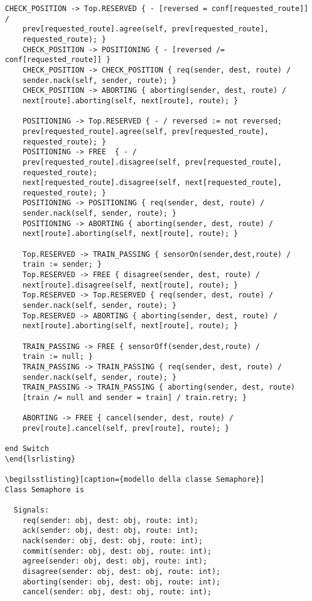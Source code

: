 \begin{lstlisting}[caption={modello della classe Switch}]
    CHECK_POSITION -> Top.RESERVED { - [reversed = conf[requested_route]] / 
    prev[requested_route].agree(self, prev[requested_route], 
    requested_route); }
    CHECK_POSITION -> POSITIONING { - [reversed /= conf[requested_route]] }
    CHECK_POSITION -> CHECK_POSITION { req(sender, dest, route) / 
    sender.nack(self, sender, route); }
    CHECK_POSITION -> ABORTING { aborting(sender, dest, route) / 
    next[route].aborting(self, next[route], route); }

    POSITIONING -> Top.RESERVED { - / reversed := not reversed; 
    prev[requested_route].agree(self, prev[requested_route], 
    requested_route); }
    POSITIONING -> FREE  { - / 
    prev[requested_route].disagree(self, prev[requested_route], 
    requested_route); 
    next[requested_route].disagree(self, next[requested_route], 
    requested_route); }
    POSITIONING -> POSITIONING { req(sender, dest, route) / 
    sender.nack(self, sender, route); }
    POSITIONING -> ABORTING { aborting(sender, dest, route) / 
    next[route].aborting(self, next[route], route); }

    Top.RESERVED -> TRAIN_PASSING { sensorOn(sender,dest,route) / 
    train := sender; }
    Top.RESERVED -> FREE { disagree(sender, dest, route) / 
    next[route].disagree(self, next[route], route); }
    Top.RESERVED -> Top.RESERVED { req(sender, dest, route) / 
    sender.nack(self, sender, route); }
    Top.RESERVED -> ABORTING { aborting(sender, dest, route) / 
    next[route].aborting(self, next[route], route); }

    TRAIN_PASSING -> FREE { sensorOff(sender,dest,route) / 
    train := null; }
    TRAIN_PASSING -> TRAIN_PASSING { req(sender, dest, route) / 
    sender.nack(self, sender, route); }
    TRAIN_PASSING -> TRAIN_PASSING { aborting(sender, dest, route) 
    [train /= null and sender = train] / train.retry; }

    ABORTING -> FREE { cancel(sender, dest, route) / 
    prev[route].cancel(self, prev[route], route); }

end Switch
\end{lsrlisting}

\begilsstlisting}[caption={modello della classe Semaphore}]
Class Semaphore is

  Signals:
    req(sender: obj, dest: obj, route: int);        
    ack(sender: obj, dest: obj, route: int);
    nack(sender: obj, dest: obj, route: int);
    commit(sender: obj, dest: obj, route: int);
    agree(sender: obj, dest: obj, route: int);
    disagree(sender: obj, dest: obj, route: int);
    aborting(sender: obj, dest: obj, route: int);
    cancel(sender: obj, dest: obj, route: int);


\end{lstlisting}
